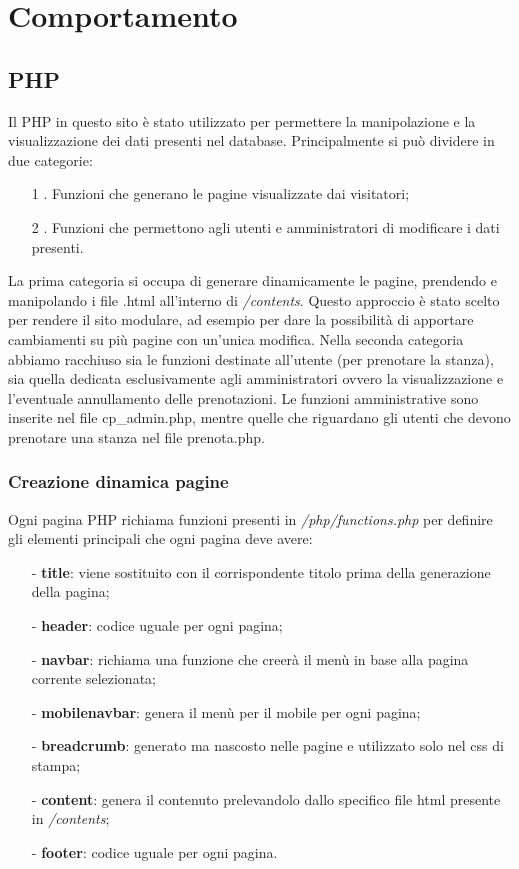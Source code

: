 \section{Comportamento} 
\subsection{PHP}
Il PHP in questo sito è stato utilizzato per permettere la manipolazione e la visualizzazione dei dati presenti nel database. Principalmente si può dividere in due categorie:
\begin{itemize}
	\item [1]. Funzioni che generano le pagine visualizzate dai visitatori;
	\item [2]. Funzioni che permettono agli utenti e amministratori di modificare i dati presenti.
\end{itemize}
La prima categoria si occupa di generare dinamicamente le pagine, prendendo e manipolando i file .html all'interno di \textit{/contents}. Questo approccio è stato scelto per rendere il sito modulare, ad esempio per dare la possibilità di apportare cambiamenti su più pagine con un'unica modifica.
Nella seconda categoria abbiamo racchiuso sia le funzioni destinate all'utente (per prenotare la stanza), sia quella dedicata esclusivamente agli amministratori ovvero la visualizzazione e l'eventuale annullamento delle prenotazioni. Le funzioni amministrative sono inserite nel file cp_admin.php, mentre quelle che riguardano gli utenti che devono prenotare una stanza nel file prenota.php.
\subsubsection{Creazione dinamica pagine}
Ogni pagina PHP richiama funzioni presenti in \textit{/php/functions.php} per definire gli elementi principali che ogni pagina deve avere:
\begin{itemize}
\item[-] \textbf{title}: viene sostituito con il corrispondente titolo prima della generazione della pagina;
\item[-] \textbf{header}: codice uguale per ogni pagina;
\item[-] \textbf{navbar}: richiama una funzione che creerà il menù in base alla pagina corrente selezionata;
\item[-] \textbf{mobilenavbar}: genera il menù per il mobile per ogni pagina;
\item[-] \textbf{breadcrumb}: generato ma nascosto nelle pagine e utilizzato solo nel css di stampa;
\item[-] \textbf{content}: genera il contenuto prelevandolo dallo specifico file html presente in \textit{/contents};
\item[-] \textbf{footer}: codice uguale per ogni pagina.
\end{itemize}
